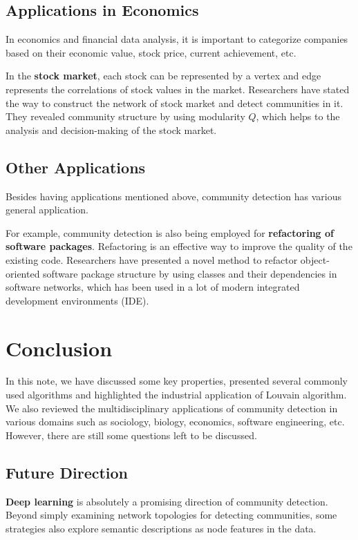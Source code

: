 \documentclass[11pt]{article}
\begin{document}
\subsection{Applications in Economics}
In economics and financial data analysis, it is important to categorize companies based on their economic value, stock price, current achievement, etc. 

\noindent In the \textbf{stock market}, each stock can be represented by a vertex and edge represents the correlations of stock values in the market. Researchers have stated the way to construct the network of stock market and detect communities in it. They revealed community structure by using modularity $Q$, which helps to the analysis and decision-making of the stock market.\cite{stock2014}

\subsection{Other Applications}
Besides having applications mentioned above, community detection has various general application. 

\noindent For example, community detection is also being employed for \textbf{refactoring of software packages}.
Refactoring is an effective way to improve the quality of the existing code. Researchers have presented a novel method to refactor object-oriented software package structure by using classes and their dependencies in software networks\cite{software2018}, which has been used in a lot of modern integrated development environments (IDE).

\section{Conclusion}
In this note, we have discussed some key properties, presented several commonly used algorithms and highlighted the industrial application of Louvain algorithm.
We also reviewed the multidisciplinary applications of community detection in various domains such as sociology, biology, economics, software engineering, etc. 
However, there are still some questions left to be discussed.
\subsection{Future Direction}
\textbf{Deep learning} is absolutely a promising direction of community detection. Beyond simply examining network topologies for detecting communities, some strategies also explore semantic descriptions as node features in the data. 
\end{document}
